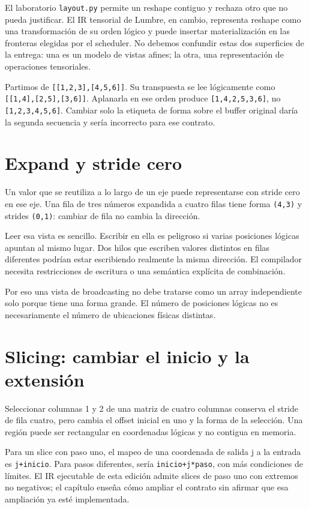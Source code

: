 \documentclass[12pt,a4paper,oneside]{report}
\begin{document}
El laboratorio \texttt{layout.py} permite un reshape contiguo y rechaza otro que no pueda justificar. El IR tensorial de Lumbre, en cambio, representa reshape como una transformación de su orden lógico y puede insertar materialización en las fronteras elegidas por el scheduler. No debemos confundir estas dos superficies de la entrega: una es un modelo de vistas afines; la otra, una representación de operaciones tensoriales.

\begin{ejemplo}
Partimos de \texttt{[[1,2,3],[4,5,6]]}. Su transpuesta se lee lógicamente como \texttt{[[1,4],[2,5],[3,6]]}. Aplanarla en ese orden produce \texttt{[1,4,2,5,3,6]}, no \texttt{[1,2,3,4,5,6]}. Cambiar solo la etiqueta de forma sobre el buffer original daría la segunda secuencia y sería incorrecto para ese contrato.

\end{ejemplo}
\section{Expand y stride cero}
Un valor que se reutiliza a lo largo de un eje puede representarse con stride cero en ese eje. Una fila de tres números expandida a cuatro filas tiene forma \texttt{(4,3)} y strides \texttt{(0,1)}: cambiar de fila no cambia la dirección.

Leer esa vista es sencillo. Escribir en ella es peligroso si varias posiciones lógicas apuntan al mismo lugar. Dos hilos que escriben valores distintos en filas diferentes podrían estar escribiendo realmente la misma dirección. El compilador necesita restricciones de escritura o una semántica explícita de combinación.

Por eso una vista de broadcasting no debe tratarse como un array independiente solo porque tiene una forma grande. El número de posiciones lógicas no es necesariamente el número de ubicaciones físicas distintas.

\section{Slicing: cambiar el inicio y la extensión}
Seleccionar columnas 1 y 2 de una matriz de cuatro columnas conserva el stride de fila cuatro, pero cambia el offset inicial en uno y la forma de la selección. Una región puede ser rectangular en coordenadas lógicas y no contigua en memoria.

Para un slice con paso uno, el mapeo de una coordenada de salida j a la entrada es \texttt{j+inicio}. Para pasos diferentes, sería \texttt{inicio+j*paso}, con más condiciones de límites. El IR ejecutable de esta edición admite slices de paso uno con extremos no negativos; el capítulo enseña cómo ampliar el contrato sin afirmar que esa ampliación ya esté implementada.
\end{document}
